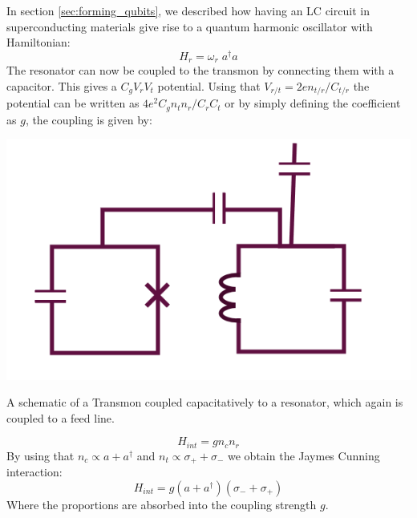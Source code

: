In section \ref{sec:forming_qubits}, we described how having an LC circuit in superconducting materials give rise to a quantum harmonic oscillator with Hamiltonian:
\begin{equation}
    H_r = \omega_r \; a^\dagger a
\end{equation}
The resonator can now be coupled to the transmon by connecting them with a capacitor. This gives a $C_g V_r V_t$ potential. Using that $V_{r/t} = 2e n_{t/r} / C_{t/r}$ the potential can be written as $4e^2C_g  n_t n_r / C_r C_t$ or by simply defining the coefficient as $g$, the coupling is given by:
\begin{marginfigure}
    \centering
    \includegraphics{Figs/Sections/computations_and_readout/qubit_resonator_feedline.png}
    \caption{A schematic of a Transmon coupled capacitatively to a resonator, which again is coupled to a feed line.}
    \label{fig:schematic_qubit_res}
\end{marginfigure}
\begin{equation}
    H_{int} = g n_c n_r 
\end{equation}
By using that $n_c \propto a + a^\dagger$ and $n_t \propto \sigma_+ + \sigma_-$ we obtain the Jaymes Cunning interaction:
\begin{equation}
    H_{int} = g (a + a^\dagger) (\sigma_- + \sigma_+)
\end{equation}
Where the proportions are absorbed into the coupling strength $g$. 


